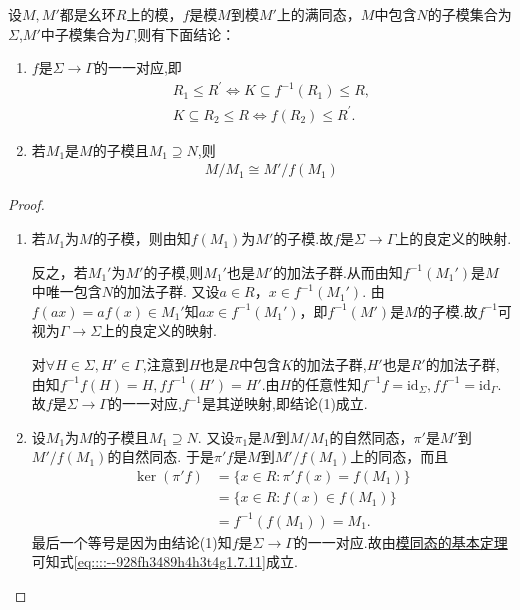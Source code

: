\documentclass[../../main.tex]{subfiles}%
\begin{document}
\begin{theorem}\label{theorem:模同态的基本定理推论}
设$M, M'$都是幺环$R$上的模，$f$是模$M$到模$M'$上的满同态，$M$中包含$N$的子模集合为$\Sigma$,$M'$中子模集合为$\Gamma$,则有下面结论：
\begin{enumerate}[(1)]
\item\label{theorem:模同态的基本定理推论-1} $f$是$\Sigma\to \Gamma$的一一对应,即
\begin{gather*}
R_1\leqslant R^{\prime}\Longleftrightarrow K\subseteq f^{-1}\left( R_1 \right) \leqslant R,
\\
K\subseteq R_2\leqslant R\Longleftrightarrow f\left( R_2 \right) \leqslant R^{\prime}.
\end{gather*}

\item\label{theorem:模同态的基本定理-3} 若$M_1$是$M$的子模且$M_1 \supseteq N$,则
\begin{align}
M/M_1 \cong M'/f(M_1) \label{eq::::--928fh3489h4h3t4g1.7.11}
\end{align}
\end{enumerate}
\end{theorem}
\begin{proof}
\begin{enumerate}[(1)]
\item 若$M_1$为$M$的子模，则由知$f(M_1)$为$M'$的子模.故$f$是$\Sigma\to \Gamma$上的良定义的映射.

反之，若$M_1'$为$M'$的子模,则$M_1'$也是$M'$的加法子群.从而由知$f^{-1}(M_1')$是$M$中唯一包含$N$的加法子群. 又设$a \in R$，$x \in f^{-1}(M_1')$. 由$f(ax) = af(x) \in M_1'$知$ax \in f^{-1}(M_1')$，即$f^{-1}(M')$是$M$的子模.故$f^{-1}$可视为$\Gamma\to \Sigma$上的良定义的映射. 

对$\forall H\in \Sigma,H'\in \Gamma$,注意到$H$也是$R$中包含$K$的加法子群,$H'$也是$R'$的加法子群,由知$f^{-1}f(H)=H,ff^{-1}(H')=H'.$由$H$的任意性知$f^{-1}f=\mathrm{id}_{\Sigma},ff^{-1}=\mathrm{id}_{\Gamma}.$故$f$是$\Sigma\to \Gamma$的一一对应,$f^{-1}$是其逆映射,即结论(1)成立.

\item 设$M_1$为$M$的子模且$M_1 \supseteq N$. 又设$\pi_1$是$M$到$M/M_1$的自然同态，$\pi'$是$M'$到$M'/f(M_1)$的自然同态. 于是$\pi' f$是$M$到$M'/f(M_1)$上的同态，而且
\begin{align*}
\ker(\pi' f) &= \{ x \in R : \pi' f(x) = f(M_1) \} \\
&= \{ x \in R : f(x) \in f(M_1) \} \\
&= f^{-1}(f(M_1)) =  M_1.
\end{align*}
最后一个等号是因为由结论(1)知$f$是$\Sigma \rightarrow \Gamma$的一一对应.故由\hyperref[theorem:模同态的基本定理]{模同态的基本定理}可知式\eqref{eq::::--928fh3489h4h3t4g1.7.11}成立.
\end{enumerate}

\end{proof}
\end{document}

